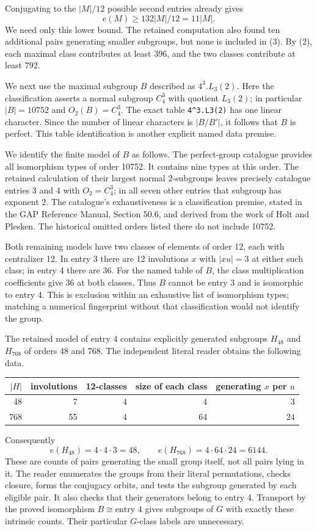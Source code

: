 \documentclass[11pt,a4paper]{article}
\begin{document}
Conjugating to the $|M|/12$ possible second entries already gives
\[
                        e(M)\geq 132|M|/12=11|M|.       \tag{3}
\]
We need only this lower bound. The retained computation also found ten
additional pairs generating smaller subgroups, but none is included
in (3). By (2), each maximal class contributes at least 396, and the
two classes contribute at least 792.

We next use the maximal subgroup $B$ described as $4^3.L_3(2)$.
Here the classification asserts a normal subgroup $C_4^3$ with
quotient $L_3(2)$; in particular $|B|=10752$ and $O_2(B)=C_4^3$.
The exact table \texttt{4\^{}3.L3(2)} has one linear character.
Since the number of linear characters is $|B/B'|$, it follows that
$B$ is perfect. This table identification is another explicit named
data premise.

We identify the finite model of $B$ as follows. The perfect-group
catalogue provides all isomorphism types of order 10752. It contains
nine types at this order. The retained calculation of their largest
normal 2-subgroups leaves precisely catalogue entries 3 and 4 with
$O_2=C_4^3$; in all seven other entries that subgroup has exponent 2.
The catalogue's exhaustiveness is a classification premise, stated in
the GAP Reference Manual, Section 50.6, and derived from the work of
Holt and Plesken. The historical omitted orders listed there do not
include 10752.

Both remaining models have two classes of elements of order 12,
each with centralizer 12. In entry 3 there are 12 involutions $x$
with $|xu|=3$ at either such class; in entry 4 there are 36.
For the named table of $B$, the class multiplication coefficients
give 36 at both classes. Thus $B$ cannot be entry 3 and is isomorphic
to entry 4. This is exclusion within an exhaustive list of
isomorphism types; matching a numerical fingerprint without that
classification would not identify the group.

The retained model of entry 4 contains explicitly generated subgroups
$H_{48}$ and $H_{768}$ of orders 48 and 768. The independent literal
reader obtains the following data.
\begin{center}\begin{tabular}{rrrrr}\toprule
$|H|$&involutions&12-classes&size of each class&generating $x$ per $u$\\\midrule
48&7&4&4&3\\
768&55&4&64&24\\\bottomrule
\end{tabular}\end{center}
Consequently
\[
                 e(H_{48})=4\cdot4\cdot3=48,
 \qquad e(H_{768})=4\cdot64\cdot24=6144.               \tag{4}
\]
These are counts of pairs generating the small group itself, not all
pairs lying in it. The reader enumerates the groups from their literal
permutations, checks closure, forms the conjugacy orbits, and tests the
subgroup generated by each eligible pair. It also checks that their
generators belong to entry 4. Transport by the proved isomorphism
$B\cong\text{entry 4}$ gives subgroups of $G$ with exactly these
intrinsic counts. Their particular $G$-class labels are unnecessary.
\end{document}

